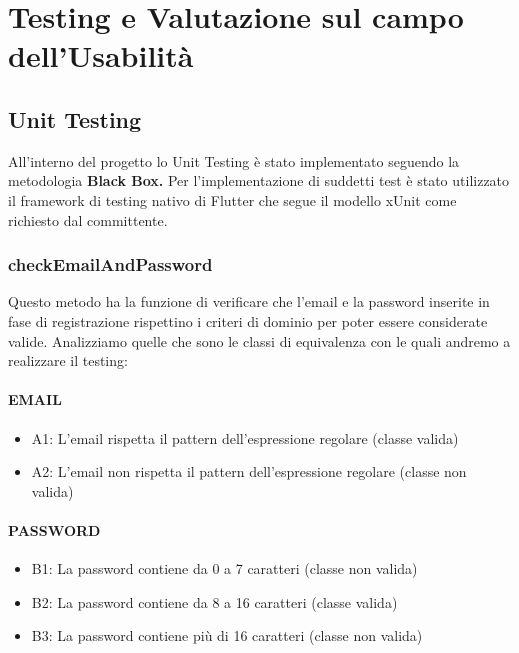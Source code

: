 \chapter{Testing e Valutazione sul campo dell'Usabilità}

\section{Unit Testing}

All'interno del progetto lo Unit Testing è stato implementato seguendo la metodologia \textbf{Black Box.} Per l'implementazione di suddetti test è stato utilizzato il framework di testing nativo di Flutter che segue il modello xUnit come richiesto dal committente.

\subsection{checkEmailAndPassword}

Questo metodo ha la funzione di verificare che l'email e la password inserite in fase di registrazione rispettino i criteri di dominio per poter essere considerate valide.\meskip
Analizziamo quelle che sono le classi di equivalenza con le quali andremo a realizzare il testing:

\subsubsection*{EMAIL}

\begin{itemize}
	\item A1: L'email rispetta il pattern dell'espressione regolare (classe valida)
	\item A2: L'email non rispetta il pattern dell'espressione regolare (classe non valida)
\end{itemize}

\subsubsection*{PASSWORD}

\begin{itemize}
	\item B1: La password contiene da 0 a 7 caratteri (classe non valida)
	\item B2: La password contiene da 8 a 16 caratteri (classe valida)
	\item B3: La password contiene più di 16 caratteri (classe non valida)
\end{itemize}\medskip

